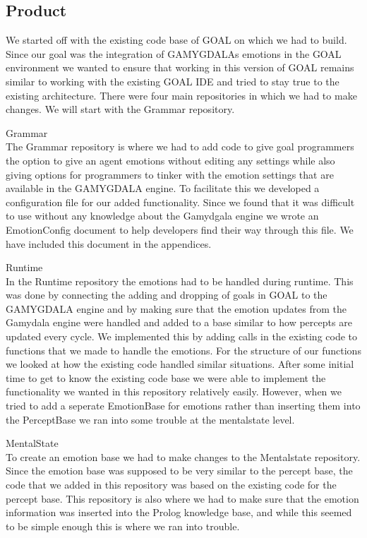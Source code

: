 \documentclass[11pt]{article}
\begin{document}
\subsection{Product}
We started off with the existing code base of GOAL\cite{GOAL} on which we had to build. Since our goal was the integration of GAMYGDALAs emotions in the GOAL environment\cite{GOAL Env} we wanted to ensure that working in this version of GOAL remains similar to working with the existing GOAL IDE and tried to stay true to the existing architecture. There were four main repositories in which we had to make changes. We will start with the Grammar repository.\par
Grammar\\
The Grammar repository is where we had to add code to give goal programmers the option to give an agent emotions without editing any settings while also giving options for programmers to tinker with the emotion settings that are available in the GAMYGDALA engine. To facilitate this we developed a configuration file for our added functionality. Since we found that it was difficult to use without any knowledge about the Gamydgala engine we wrote an EmotionConfig document to help developers find their way through this file. We have included this document in the appendices. \par
Runtime\\ 
In the Runtime repository the emotions had to be handled during runtime. This was done by connecting the adding and dropping of goals in GOAL to the GAMYGDALA engine and by making sure that the emotion updates from the Gamydala engine were handled and added to a base similar to how percepts are updated every cycle. We implemented this by adding calls in the existing code to functions that we made to handle the emotions. For the structure of our functions we looked at how the existing code handled similar situations. After some initial time to get to know the existing code base we were able to implement the functionality we wanted in this repository relatively easily. However, when we tried to add a seperate EmotionBase for emotions rather than inserting them into the PerceptBase we ran into some trouble at the mentalstate level. \par 
MentalState\\
To create an emotion base we had to make changes to the Mentalstate repository. Since the emotion base was supposed to be very similar to the percept base, the code that we added in this repository was based on the existing code for the percept base. This repository is also where we had to make sure that the emotion information was inserted into the Prolog knowledge base, and while this seemed to be simple enough this is where we ran into trouble. \par 
\end{document}
